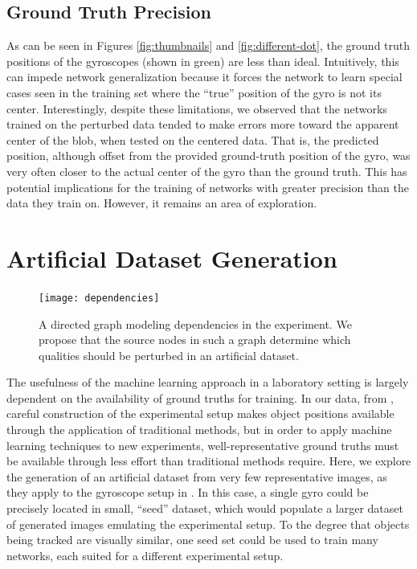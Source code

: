 \documentclass[twocolumn, 10pt]{asme2ej}
\begin{document}
\subsection{Ground Truth Precision}
\label{sec:ground-truth-prec}

As can be seen in Figures \ref{fig:thumbnails} and \ref{fig:different-dot}, the
ground truth positions of the gyroscopes (shown in green) are less than
ideal. Intuitively, this can impede network generalization because it forces the
network to learn special cases seen in the training set where the ``true''
position of the gyro is not its center. Interestingly, despite these
limitations, we observed that the networks trained on the perturbed data tended
to make errors more toward the apparent center of the blob, when tested on the
centered data. That is, the predicted position, although offset from the
provided ground-truth position of the gyro, was very often closer to the actual
center of the gyro than the ground truth. This has potential implications for
the training of networks with greater precision than the data they train
on. However, it remains an area of exploration.

\section{Artificial Dataset Generation}
\label{sec:artif-datas-gener}

\begin{figure}
  \centering
  \texttt{[image: dependencies]}
  \caption{A directed graph modeling dependencies in the experiment. We propose
    that the source nodes in such a graph determine which qualities should be
    perturbed in an artificial dataset.}
  \label{fig:dependencies}
\end{figure}

The usefulness of the machine learning approach in a laboratory setting is
largely dependent on the availability of ground truths for training. In our
data, from \cite{nash_topological_2015}, careful construction of the
experimental setup makes object positions available through the application of
traditional methods, but in order to apply machine learning techniques to new
experiments, well-representative ground truths must be available through less
effort than traditional methods require. Here, we explore the generation of an
artificial dataset from very few representative images, as they apply to the
gyroscope setup in \cite{nash_topological_2015}. In this case, a single gyro
could be precisely located in small, ``seed'' dataset, which would populate a
larger dataset of generated images emulating the experimental setup. To the
degree that objects being tracked are visually similar, one seed set could be
used to train many networks, each suited for a different experimental setup.
\end{document}
